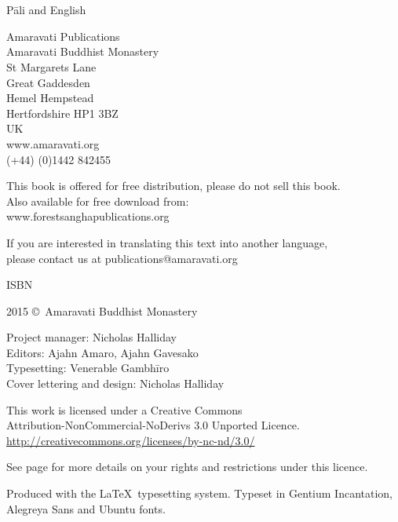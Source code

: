 
\thispagestyle{empty}

\enlargethispage{\baselineskip}

{\centering\small
\setlength{\parskip}{15pt}

{\normalsize
\thetitle\\
\thesubtitle\\
Pāli and English}

Amaravati Publications\\
Amaravati Buddhist Monastery\\
St Margarets Lane\\
Great Gaddesden\\
Hemel Hempstead\\
Hertfordshire HP1 3BZ\\
UK\\
www.amaravati.org\\
(+44) (0)1442 842455

This book is offered for free distribution, please do not sell this book.\\
Also available for free download from:\\
www.forestsanghapublications.org

If you are interested in translating this text into another language,\\
please contact us at publications@amaravati.org

ISBN \theISBN

2015 \copyright\ Amaravati Buddhist Monastery

Project manager: Nicholas Halliday\\
Editors: Ajahn Amaro, Ajahn Gavesako\\
Typesetting: Venerable Gambhīro\\
Cover lettering and design: Nicholas Halliday

\vfill

This work is licensed under a Creative Commons\\
Attribution-NonCommercial-NoDerivs 3.0 Unported Licence.\\
\href{http://creativecommons.org/licenses/by-nc-nd/3.0/}{http://creativecommons.org/licenses/by-nc-nd/3.0/}

See page \pageref{copyright-details} for more details on your rights and restrictions under this licence.

Produced with the \LaTeX\ typesetting system. Typeset in Gentium Incantation,\\
Alegreya Sans and Ubuntu fonts.

\theEditionInfo


}

